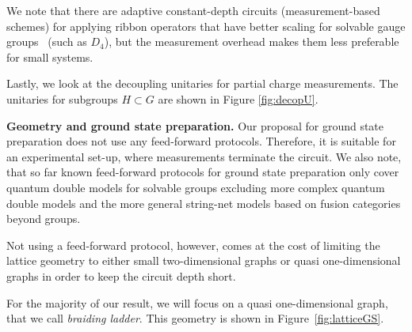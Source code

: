 \documentclass[a4paper,twocolumn,11pt, accepted=2024-06-14]{quantumarticle}
\begin{document}
We note that there are adaptive constant-depth circuits (measurement-based schemes) for applying ribbon operators that have better scaling for solvable gauge groups~\cite{bravyi2022adaptive} (such as $D_4$), but the measurement overhead makes them less preferable for small systems. 

Lastly, we look at the decoupling unitaries for partial charge measurements. The unitaries for subgroups $H\subset G$ are shown in Figure \ref{fig:decopU}. 


\textbf{Geometry and ground state preparation.}
Our proposal for ground state preparation does not use any feed-forward protocols. Therefore, it is suitable for an experimental set-up, where measurements terminate the circuit. We also note, that so far known feed-forward protocols for ground state preparation only cover quantum double models for solvable groups excluding more complex quantum double models and the more general string-net models based on fusion categories beyond groups.

Not using a feed-forward protocol, however, comes at the cost of limiting the lattice geometry to either small two-dimensional graphs or quasi one-dimensional graphs in order to keep the circuit depth short.

For the majority of our result, we will focus on a quasi one-dimensional graph, that we call \emph{braiding ladder}. 
This geometry is shown in Figure~\ref{fig:latticeGS}. 
\end{document}
